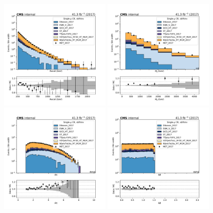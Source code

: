 \begin{figure}[htbp]
    \begin{center}
        \includegraphics[width=0.49\textwidth]{fig/datamc/cr_1m_vbf/cr_1m_vbf_recoil_losf_2017.pdf}
        \includegraphics[width=0.49\textwidth]{fig/datamc/cr_1m_vbf/cr_1m_vbf_mjj_losf_2017.pdf} \\
        \includegraphics[width=0.49\textwidth]{fig/datamc/cr_1m_vbf/cr_1m_vbf_detajj_losf_2017.pdf}
        \includegraphics[width=0.49\textwidth]{fig/datamc/cr_1m_vbf/cr_1m_vbf_dphijj_losf_2017.pdf}

\end{center}
\end{figure}
